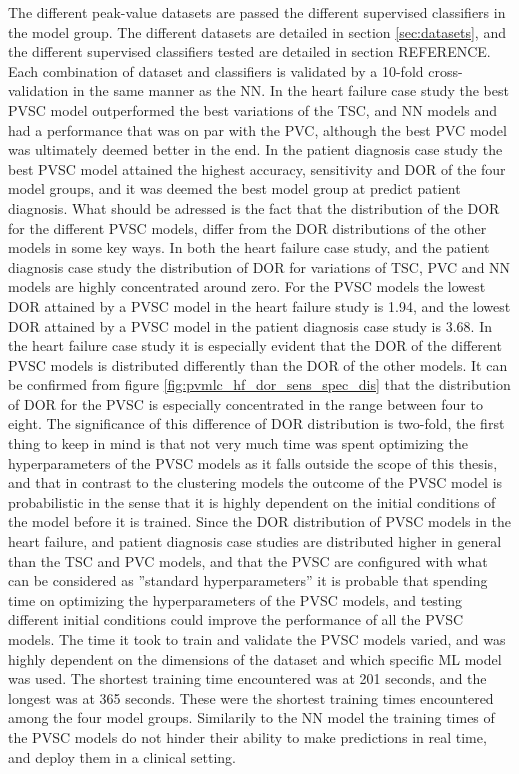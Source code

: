 The different peak-value datasets are passed the different supervised classifiers in the model group. 
The different datasets are detailed in section \ref{sec:datasets}, and the different supervised classifiers tested are detailed in section REFERENCE.
Each combination of dataset and classifiers is validated by a 10-fold cross-validation in the same manner as the NN. 
In the heart failure case study the best PVSC model outperformed the best variations of the TSC, and NN models and had a performance that was on par with the PVC, although the best PVC model was ultimately deemed better in the end.
In the patient diagnosis case study the best PVSC model attained the highest accuracy, sensitivity and DOR of the four model groups, and it was deemed the best model group at predict patient diagnosis. 
What should be adressed is the fact that the distribution of the DOR for the different PVSC models, differ from the DOR distributions of the other models in some key ways.
In both the heart failure case study, and the patient diagnosis case study the distribution of DOR for variations of TSC, PVC and NN models are highly concentrated around zero. 
For the PVSC models the lowest DOR attained by a PVSC model in the heart failure study is 1.94, and the lowest DOR attained by a PVSC model in the patient diagnosis case study is 3.68.
In the heart failure case study it is especially evident that the DOR of the different PVSC models is distributed differently than the DOR of the other models.
It can be confirmed from figure \ref{fig:pvmlc_hf_dor_sens_spec_dis} that the distribution of DOR for the PVSC is especially concentrated in the range between four to eight.
The significance of this difference of DOR distribution is two-fold, the first thing to keep in mind is that not very much time was spent optimizing the hyperparameters of the PVSC models as it falls outside the scope of this thesis, and that in contrast to the clustering models the outcome of the PVSC model is probabilistic in the sense that it is highly dependent on the initial conditions of the model before it is trained. 
Since the DOR distribution of PVSC models in the heart failure, and patient diagnosis case studies are distributed higher in general than the TSC and PVC models, and that the PVSC are configured with what can be considered as ''standard hyperparameters'' it is probable that spending time on optimizing the hyperparameters of the PVSC models, and testing different initial conditions could improve the performance of all the PVSC models. 
The time it took to train and validate the PVSC models varied, and was highly dependent on the dimensions of the dataset and which specific ML model was used. 
The shortest training time encountered was at 201 seconds, and the longest was at 365 seconds.
These were the shortest training times encountered among the four model groups.
Similarily to the NN model the training times of the PVSC models do not hinder their ability to make predictions in real time, and deploy them in a clinical setting.
